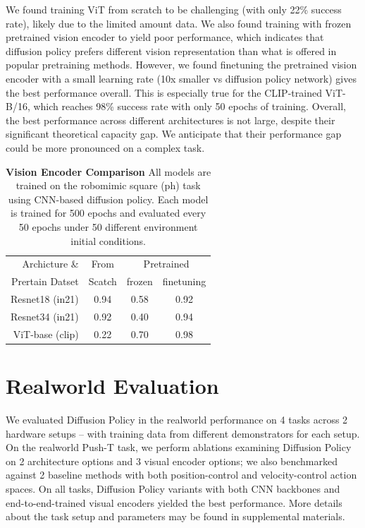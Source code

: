 \documentclass[Afour,sageh,times]{sagej}
\begin{document}
We found training ViT from scratch to be challenging (with only 22\% success rate), likely due to the limited amount data.
We also found training with frozen pretrained vision encoder to yield poor performance, which indicates that diffusion policy prefers different vision representation than what is offered in popular pretraining methods.
However, we found finetuning the pretrained vision encoder with a small learning rate (10x smaller vs diffusion policy network) gives the best performance overall. This is especially true for the CLIP-trained ViT-B/16, which reaches 98\% success rate with only 50 epochs of training.
Overall, the best performance across different architectures is not large, despite their significant theoretical capacity gap. We anticipate that their performance gap could be more pronounced on a complex task.

\begin{table}
\centering
\begin{tabular}{r|c|cc}
\toprule
Archicture \& & From & \multicolumn{2}{c}{Pretrained} \\
Prertain Datset& Scatch & frozen & finetuning \\
\midrule
Resnet18 (in21) & 0.94   & 0.58      & 0.92             \\
Resnet34 (in21)& 0.92   & 0.40      & 0.94             \\
ViT-base (clip)& 0.22   & 0.70      & 0.98             \\
\bottomrule
\end{tabular}
\caption{\textbf{Vision Encoder Comparison} All models are trained on the robomimic square (ph) task using CNN-based diffusion policy. Each model is trained for 500 epochs and evaluated every 50 epochs under 50 different environment initial conditions.}
\label{tab:ablation_vision_encorder} 
\vspace{-2mm}
\end{table}


\section{Realworld Evaluation}
We evaluated Diffusion Policy in the realworld performance on 4 tasks across 2 hardware setups -- with training data from different demonstrators for each setup. On the realworld Push-T task, we perform ablations examining Diffusion Policy on 2 architecture options and 3 visual encoder options; we also benchmarked against 2 baseline methods with both position-control and velocity-control action spaces. On all tasks, Diffusion Policy variants with both CNN backbones and end-to-end-trained visual encoders yielded the best performance. More details about the task setup and parameters may be found in supplemental materials.
\end{document}
